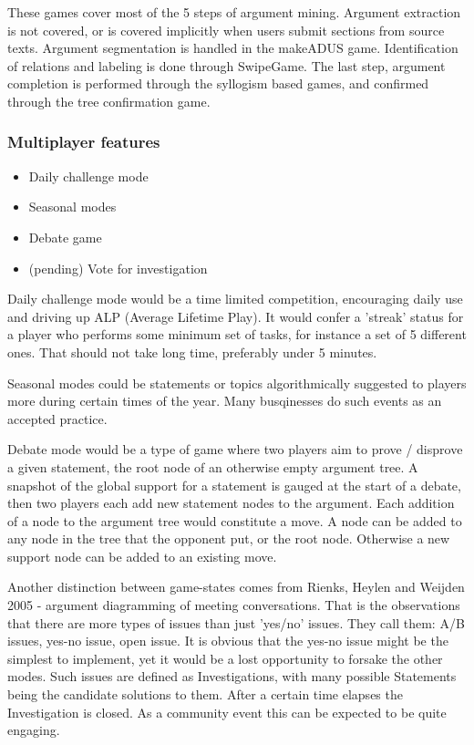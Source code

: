 \documentclass{article}
\begin{document}
These games cover most of the 5 steps of argument mining. 
Argument extraction is not covered, or is covered implicitly when users submit sections from source texts. Argument segmentation is handled in the makeADUS game. Identification of relations and labeling is done through SwipeGame. The last step, argument completion is performed through the syllogism based games, and confirmed through the tree confirmation game.

\subsubsection{Multiplayer features}
\begin{itemize}
  \item Daily challenge mode
  \item Seasonal modes
  \item Debate game
  \item (pending) Vote for investigation
\end{itemize}
Daily challenge mode would be a time limited competition, encouraging daily use and driving up ALP (Average Lifetime Play). It would confer a 'streak' status for a player who performs some minimum set of tasks, for instance a set of 5 different ones. That should not take long time, preferably under 5 minutes.

Seasonal modes could be statements or topics algorithmically suggested to players more during certain times of the year. Many busqinesses do such events as an accepted practice.

Debate mode would be a type of game where two players aim to prove / disprove a given statement, the root node of an otherwise empty argument tree.  A snapshot of the global support for a statement is gauged at the start of a debate, then two players each add new statement nodes to the argument. Each addition of a node to the argument tree would constitute a move.
A node can be added to any node in the tree that the opponent put, or the root node. Otherwise a new support node can be added to an existing move.


Another distinction between game-states comes from Rienks, Heylen and Weijden 2005 - argument diagramming of meeting conversations. That is the observations that there are more types of issues than just 'yes/no' issues. They call them: A/B issues, yes-no issue, open issue. It is obvious that the yes-no issue might be the simplest to implement, yet it would be a lost opportunity to forsake the other modes.
Such issues are defined as Investigations, with many possible Statements being the candidate solutions to them. After a certain time elapses the Investigation is closed. As a community event this can be expected to be quite engaging.
\end{document}
